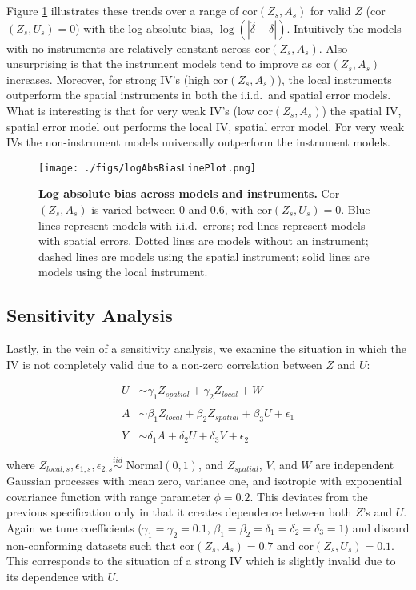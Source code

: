 \documentclass[12pt]{article}
\begin{document}
Figure \ref{fig:biasLines} illustrates these trends over a range of cor$(Z_s,A_s)$ for valid $Z$ (cor$(Z_s,U_s)=0$) with the log absolute bias, $\log(|\hat{\delta} - \delta|)$. Intuitively the models with no instruments are relatively constant across cor$(Z_s,A_s)$. Also unsurprising is that the instrument models tend to improve as cor$(Z_s,A_s)$ increases. Moreover, for strong IV's (high cor$(Z_s,A_s)$), the local instruments outperform the spatial instruments in both the i.i.d.~and spatial error models. What is interesting is that for very weak IV's (low cor$(Z_s,A_s)$) the spatial IV, spatial error model out performs the local IV, spatial error model. For very weak IVs the non-instrument models universally outperform the instrument models. 

\begin{figure}[h]
    \centering
    \texttt{[image: ./figs/logAbsBiasLinePlot.png]}
    \caption{\textbf{Log absolute bias across models and instruments.} Cor$(Z_s,A_s)$ is varied between 0 and 0.6, with cor$(Z_s,U_s) = 0$. Blue lines represent models with i.i.d.~errors; red lines represent models with spatial errors. Dotted lines are models without an instrument; dashed lines are models using the spatial instrument; solid lines are models using the local instrument.}
    \label{fig:biasLines}
\end{figure}



\subsection{Sensitivity Analysis} \label{ss3:squareSim}

Lastly, in the vein of a sensitivity analysis, we examine the situation in which the IV is not completely valid due to a non-zero correlation between $Z$ and $U$: 
\begin{singlespace}
\begin{align*}
      U  &\sim\gamma_1Z_{spatial}+\gamma_2Z_{local}+W\\ \\
      A      &\sim \beta_1 Z_{local} +\beta_2 Z_{spatial} +\beta_3 U +\epsilon_1\\ \\
      Y      &\sim \delta_1 A +  \delta_2 U + \delta_3 V + \epsilon_2
\end{align*}
\end{singlespace}
\noindent where $Z_{local,s},\epsilon_{1,s},\epsilon_{2,s} \stackrel{iid}{\sim}$ Normal$(0,1)$, and $Z_{spatial}$, $V$, and $W$ are independent Gaussian processes with mean zero, variance one, and isotropic with exponential covariance function with range parameter $\phi = 0.2$. This deviates from the previous specification only in that it creates dependence between both $Z$'s and $U$.  Again we tune coefficients ($\gamma_1 = \gamma_2 = 0.1$, $\beta_1 = \beta_2 = \delta_1 = \delta_2 = \delta_3 = 1$) and discard non-conforming datasets such that cor$(Z_s,A_s)=0.7$ and cor$(Z_s,U_s)=0.1$.  This corresponds to the situation of a strong IV which is slightly invalid due to its dependence with $U$. 
\end{document}
